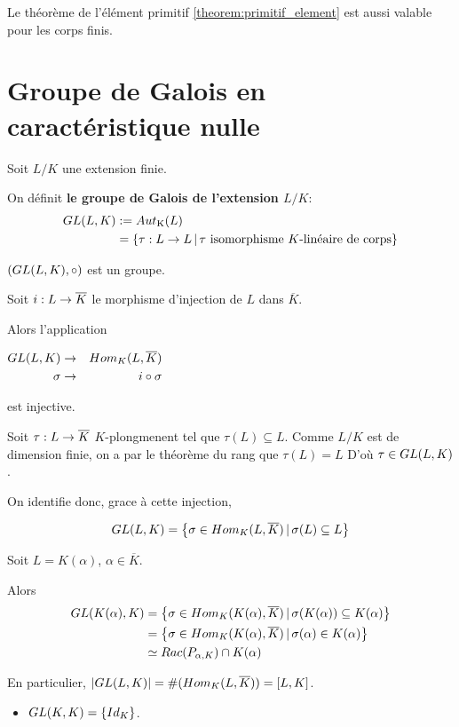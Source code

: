 \begin{remarque}
	Le théorème de l'élément primitif \ref{theorem:primitif_element} est aussi
	valable pour les corps finis.
\end{remarque}

\section{Groupe de Galois en caractéristique nulle}

\begin{definition} 
	Soit $L/K$ une extension finie.

	On définit \textbf{le groupe de Galois de l'extension $L/K$}:
	\begin{align*}
		GL(L, K) & := Aut_{\text{K}}(L) \\
		& = \left\{\tau : L \rightarrow L \, | \, \text{$\tau$ isomorphisme
		$K$-linéaire de corps} \right\}
	\end{align*}

	$(GL(L, K), \circ)$ est un groupe.
\end{definition}

Soit $i : L \rightarrow \overline{K}$ le morphisme d'injection de $L$ dans
$\overline{K}$.

Alors l'application

\begin{center}
$
\begin{aligned}
	GL(L, K) &\rightarrow& Hom_{K}(L, \overline{K}) \\
	\sigma &\rightarrow& i \circ \sigma
\end{aligned}
$
\end{center}

est injective.

Soit $\tau : L \rightarrow \overline{K}$ $K$-plongmenent tel que $\tau(L)
\subseteq L$. Comme $L/K$ est de dimension finie, on a par le théorème du rang
que $\tau(L) = L$
D'où $\tau \in GL(L, K)$.

On identifie donc, grace à cette injection,

\begin{equation*}
	GL(L, K) = \left\{\sigma \in
	Hom_{K}(L, \overline{K}) \, | \, \sigma(L) \subseteq L \right\}
\end{equation*}

\begin{exemple}
	Soit $L = K(\alpha)$, $\alpha \in \overline{K}$.

	Alors
	\begin{align*}
		GL(K(\alpha), K)
		& = \left\{\sigma \in
			Hom_{K}(K(\alpha), \overline{K}) \, | \, \sigma(K(\alpha)) \subseteq
			K(\alpha) \right\} \\
		& = \left\{\sigma \in
			Hom_{K}(K(\alpha), \overline{K}) \, | \, \sigma(\alpha) \in
			K(\alpha) \right\} \\
		& \simeq Rac(P_{\alpha, K}) \cap K(\alpha)
	\end{align*}

	En particulier, $|GL(L, K)| =
	\#(Hom_{K}(L, \overline{K})) = [L, K]$.
\end{exemple}

\begin{exemple}
	\begin{itemize}
		\item $GL(K, K) = \left\{ Id_{K} \right\}$.
	\end{itemize}
\end{exemple}
